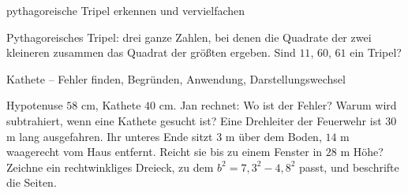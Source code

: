 \begin{aufgabe}{pythagoreische Tripel erkennen und vervielfachen}
\begin{teile}
\teil Pythagoreisches Tripel: drei ganze Zahlen, bei denen die Quadrate der zwei kleineren zusammen das Quadrat der größten ergeben. Sind $11$, $60$, $61$ ein Tripel?
\end{teile}
\end{aufgabe}

\begin{aufgabe}{Kathete – Fehler finden, Begründen, Anwendung, Darstellungswechsel}
\begin{teile}
\teil Hypotenuse $58$ cm, Kathete $40$ cm. Jan rechnet:  Wo ist der Fehler?
\teil Warum wird subtrahiert, wenn eine Kathete gesucht ist?
\teil Eine Drehleiter der Feuerwehr ist $30$ m lang ausgefahren. Ihr unteres Ende sitzt $3$ m über dem Boden, $14$ m waagerecht vom Haus entfernt. Reicht sie bis zu einem Fenster in $28$ m Höhe?
\teil Zeichne ein rechtwinkliges Dreieck, zu dem $b^2 = 7{,}3^2 - 4{,}8^2$ passt, und beschrifte die Seiten.

\end{teile}
\end{aufgabe}
